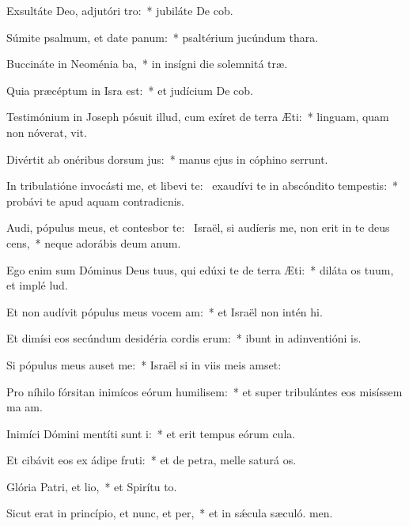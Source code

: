 \item Exsultáte Deo, adjutóri tro:~* jubiláte De cob.
\item Súmite psalmum, et date panum:~* psaltérium jucúndum  thara.
\item Buccináte in Neoménia ba,~* in insígni die solemnitá træ.
\item Quia præcéptum in Isra est:~* et judícium De cob.
\item Testimónium in Joseph pósuit illud, cum exíret de terra Æti:~* linguam, quam non nóverat, vit.
\item Divértit ab onéribus dorsum jus:~* manus ejus in cóphino serrunt.
\item In tribulatióne invocásti me, et libevi te:~\pscross{} exaudívi te in abscóndito tempestis:~* probávi te apud aquam contradicnis.
\item Audi, pópulus meus, et contesbor te:~\pscross{} Israël, si audíeris me, non erit in te deus cens,~* neque adorábis deum anum.
\item Ego enim sum Dóminus Deus tuus, qui edúxi te de terra Æti:~* diláta os tuum, et implé lud.
\item Et non audívit pópulus meus vocem am:~* et Israël non intén hi.
\item Et dimísi eos secúndum desidéria cordis erum:~* ibunt in adinventióni is.
\item Si pópulus meus auset me:~* Israël si in viis meis amset:
\item Pro níhilo fórsitan inimícos eórum humilisem:~* et super tribulántes eos misíssem ma am.
\item Inimíci Dómini mentíti sunt i:~* et erit tempus eórum  cula.
\item Et cibávit eos ex ádipe fruti:~* et de petra, melle saturá os.
\item Glória Patri, et lio,~* et Spirítu to.
\item Sicut erat in princípio, et nunc, et per,~* et in sǽcula sæculó. men.
